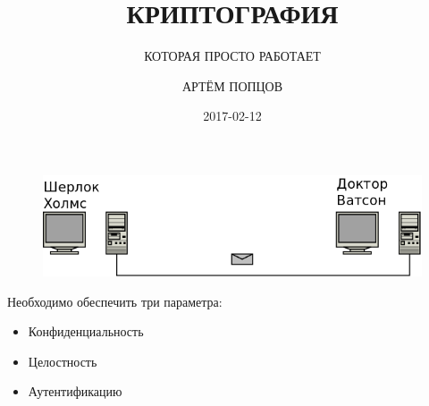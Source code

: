 \documentclass[presentation]{beamer}
\author{АРТЁМ ПОПЦОВ}
\date{2017-02-12}
\title{\decofourleft\hspace{.30em} КРИПТОГРАФИЯ \hspace{.30em}\decofourright}
\subtitle{КОТОРАЯ ПРОСТО РАБОТАЕТ}
\newcommand{\RaisedRightHand}{%
  \raisebox{-.50em}{\Large\HandRight}
}
\begin{document}
\maketitle



\begin{frame}{}
  \setcounter{tocdepth}{1}
  \tableofcontents
\end{frame}



\section{}

\begin{frame}{}
  \begin{figure}[htb]
    \centering
    \includegraphics[width=1.0\textwidth]{network-1}
  \end{figure}
  \RaisedRightHand Необходимо обеспечить три параметра:
  \begin{itemize}
  \item Конфиденциальность
  \item Целостность
  \item Аутентификацию
  \end{itemize}
\end{frame}
\end{document}

